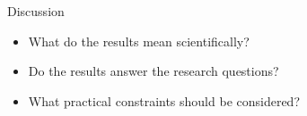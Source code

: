 \begin{frame}{Discussion}

\begin{itemize}
    \item What do the results mean scientifically?
    \item Do the results answer the research questions?
    \item What practical constraints should be considered?
\end{itemize}

\end{frame}
